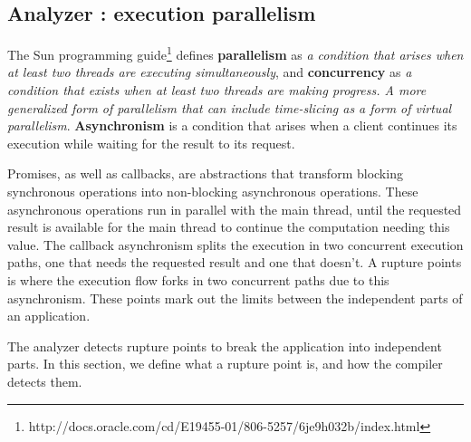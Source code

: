 
\subsection{Analyzer : execution parallelism} \label{section:analyzer}

The Sun programming guide\footnote{\raggedright http://docs.oracle.com/cd/E19455-01/806-5257/6je9h032b/index.html} defines \textbf{parallelism} as \textit{a condition that arises when at least two threads are executing simultaneously}, and \textbf{concurrency} as \textit{a condition that exists when at least two threads are making progress. A more generalized form of parallelism that can include time-slicing as a form of virtual parallelism}.
\textbf{Asynchronism} is a condition that arises when a client continues its execution while waiting for the result to its request.

Promises\cite{Liskov1988}, as well as callbacks, are abstractions that transform blocking synchronous operations into non-blocking asynchronous operations.
These asynchronous operations run in parallel with the main thread, until the requested result is available for the main thread to continue the computation needing this value.
The callback asynchronism splits the execution in two concurrent execution paths, one that needs the requested result and one that doesn't.
A rupture points is where the execution flow forks in two concurrent paths due to this asynchronism.
These points mark out the limits between the independent parts of an application.
 
The analyzer detects rupture points to break the application into independent parts.
In this section, we define what a rupture point is, and how the compiler detects them.

